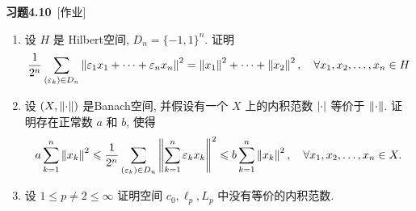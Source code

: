 	\textbf{习题4.10}\ [作业]\ \ \begin{enumerate}[(1)]
		\item 设 $ H $ 是 Hilbert空间, $ D_{n}=\{ -1, 1 \}^{n} $. 证明
		\[
			\frac{1}{2^{n}}\sum_{(\varepsilon_{k})\in D_{n}}\left\| \varepsilon_{1}x_{1}+\cdots+\varepsilon_{n}x_{n} \right\|^{2}=\left\| x_{1} \right\|^{2}+\cdots+\left\| x_{2} \right\|^{2}, \quad \forall x_{1}, x_{2}, \dots, x_{n}\in H
		\]
  		\item 设 $ (X, \left\| \cdot \right\|) $ 是Banach空间, 并假设有一个 $ X $ 上的内积范数 $ \left| \cdot \right|  $ 等价于 $ \left\| \cdot \right\| $. 证明存在正常数 $ a $ 和 $ b $, 使得
  		\[
			a\sum_{k=1}^{n}\left\| x_{k} \right\|^{2}\leqslant\frac{1}{2^{n}}\sum_{(\varepsilon_{k})\in D_{n}}\left\| \sum_{k=1}^{n}\varepsilon_{k}x_{k} \right\|^{2}\leqslant b\sum_{k=1}^{n}\left\| x_{k} \right\|^{2}, \quad \forall x_{1}, x_{2}, \dots, x_{n} \in X.
		\]
		\item 设 $ 1\leqslant p\ne2\leqslant\infty $ 证明空间 $ c_{0}, \ell_{p}, L_{p} $ 中没有等价的内积范数.
	\end{enumerate}
